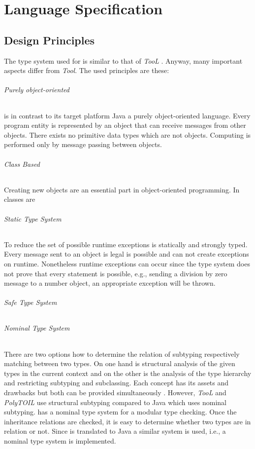 \part{Language Specification}
\chapter{Design Principles}
The type system used for \ooplss is similar to that of \emph{TooL}
\cite{gawecki_tool:_1995}. Anyway, many important aspects differ from
\emph{Tool}. The used principles are these:

\paragraph{Purely object-oriented}
\ooplss is in contrast to its target platform Java a purely
object-oriented language. Every program entity is represented by an
object that can receive messages from other objects. There exists no
primitive data types which are not objects. Computing is performed only
by message passing between objects.

\paragraph{Class Based}
Creating new objects are an essential part in object-oriented
programming. In \ooplss classes are

\paragraph{Static Type System}
To reduce the set of possible runtime exceptions \ooplss is statically
and strongly typed. Every message sent to an object is legal is possible
and can not create exceptions on runtime. Nonetheless runtime exceptions
can occur since the type system does not prove that every statement is
possible, e.g., sending a division by zero message to a number object,
an appropriate exception will be thrown.

\paragraph{Safe Type System}

\paragraph{Nominal Type System}
There are two options how to determine the relation of subtyping
respectively matching between two types. On one hand is structural
analysis of the given types in the current context and on the other
is the analysis of the type hierarchy and restricting subtyping and
subclassing. Each concept has its assets and drawbacks but both can
be provided simultaneously \cite{malayeri_integrating_2008}. However,
\emph{TooL} and \emph{PolyTOIL} use structural subtyping compared to
Java which uses nominal subtyping. \ooplss has a nominal type system
for a modular type checking. Once the inheritance relations are checked,
it is easy to determine whether two types are in relation or not. Since
\ooplss is translated to Java a similar system is used, i.e., a nominal
type system is implemented.

